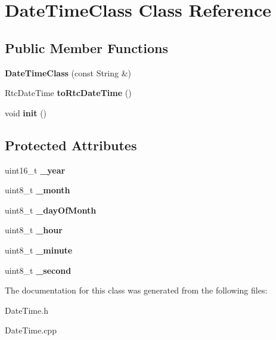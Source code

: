 \hypertarget{class_date_time_class}{\section{Date\-Time\-Class Class Reference}
\label{class_date_time_class}
}
\subsection*{Public Member Functions}
\begin{DoxyCompactItemize}
\item 
\hypertarget{class_date_time_class_aaea82ac70f8e539de00373bdb1d131b2}{{\bfseries Date\-Time\-Class} (const String \&)}\label{class_date_time_class_aaea82ac70f8e539de00373bdb1d131b2}

\item 
\hypertarget{class_date_time_class_ac11200b5d6354563cae16bf042660817}{Rtc\-Date\-Time {\bfseries to\-Rtc\-Date\-Time} ()}\label{class_date_time_class_ac11200b5d6354563cae16bf042660817}

\item 
\hypertarget{class_date_time_class_aa8880371b6f35b06a80ca91e5cfcb610}{void {\bfseries init} ()}\label{class_date_time_class_aa8880371b6f35b06a80ca91e5cfcb610}

\end{DoxyCompactItemize}
\subsection*{Protected Attributes}
\begin{DoxyCompactItemize}
\item 
\hypertarget{class_date_time_class_a531f253714868c614adb5fb0b9e6c2ae}{uint16\-\_\-t {\bfseries \-\_\-year}}\label{class_date_time_class_a531f253714868c614adb5fb0b9e6c2ae}

\item 
\hypertarget{class_date_time_class_afb3c3a90c1c093b7bed70b7cc1bffefe}{uint8\-\_\-t {\bfseries \-\_\-month}}\label{class_date_time_class_afb3c3a90c1c093b7bed70b7cc1bffefe}

\item 
\hypertarget{class_date_time_class_a8e81ffccd567477b0f00efaf92e23fda}{uint8\-\_\-t {\bfseries \-\_\-day\-Of\-Month}}\label{class_date_time_class_a8e81ffccd567477b0f00efaf92e23fda}

\item 
\hypertarget{class_date_time_class_adf02b30b5589a4c4a223abed3dce265d}{uint8\-\_\-t {\bfseries \-\_\-hour}}\label{class_date_time_class_adf02b30b5589a4c4a223abed3dce265d}

\item 
\hypertarget{class_date_time_class_ad54b6c0299471e71c7ee86ba32030859}{uint8\-\_\-t {\bfseries \-\_\-minute}}\label{class_date_time_class_ad54b6c0299471e71c7ee86ba32030859}

\item 
\hypertarget{class_date_time_class_a43608184ce367b85b33ac5d1cdf880aa}{uint8\-\_\-t {\bfseries \-\_\-second}}\label{class_date_time_class_a43608184ce367b85b33ac5d1cdf880aa}

\end{DoxyCompactItemize}


The documentation for this class was generated from the following files\-:\begin{DoxyCompactItemize}
\item 
Date\-Time.\-h\item 
Date\-Time.\-cpp\end{DoxyCompactItemize}
